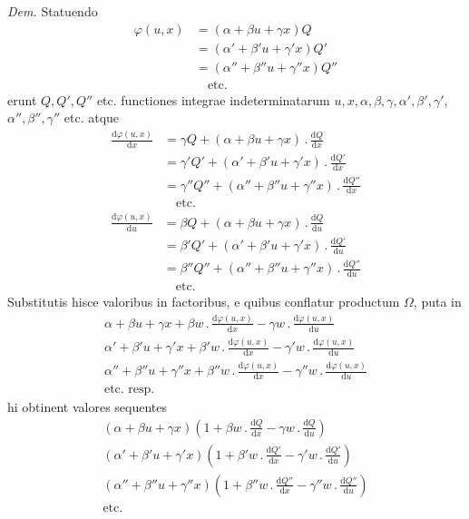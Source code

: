 \textit{Dem.} Statuendo
\[
\begin{aligned}
\varphi(u,x)&=(\alpha+\beta u+\gamma x)Q\\
&=(\alpha'+\beta'u+\gamma'x)Q'\\
&=(\alpha''+\beta''u+\gamma''x)Q''\\
&\quad\text{etc.}
\end{aligned}
\]
erunt $Q,Q',Q''$ etc. functiones integrae indeterminatarum $u,\allowbreak x,\allowbreak \alpha,\allowbreak \beta,\allowbreak \gamma,\allowbreak \alpha',\allowbreak \beta',\allowbreak \gamma'$,
$\alpha'',\beta'',\gamma''$ etc. atque
\[
\begin{aligned}
\frac{\mathrm d\varphi(u,x)}{\mathrm dx}&=\gamma Q+(\alpha+\beta u+\gamma x)\, .\,\frac{\mathrm dQ}{\mathrm dx}\\
&=\gamma'Q'+(\alpha'+\beta'u+\gamma'x)\, .\,\frac{\mathrm dQ'}{\mathrm dx}\\
&=\gamma''Q''+(\alpha''+\beta''u+\gamma''x)\, .\,\frac{\mathrm dQ''}{\mathrm dx}\\
&\quad\text{etc.}
\end{aligned}
\]
\[
\begin{aligned}
\frac{\mathrm d\varphi(u,x)}{\mathrm du}&=\beta Q+(\alpha+\beta u+\gamma x)\, .\,\frac{\mathrm dQ}{\mathrm du}\\
&=\beta'Q'+(\alpha'+\beta'u+\gamma'x)\, .\,\frac{\mathrm dQ'}{\mathrm du}\\
&=\beta''Q''+(\alpha''+\beta''u+\gamma''x)\, .\,\frac{\mathrm dQ''}{\mathrm du}\\
&\quad\text{etc.}
\end{aligned}
\]
Substitutis hisce valoribus in factoribus, e quibus conflatur productum $\Omega$,
puta in
\[
\begin{gathered}
\alpha+\beta u+\gamma x+\beta w\, .\,\frac{\mathrm d\varphi(u,x)}{\mathrm dx}-\gamma w\, .\,\frac{\mathrm d\varphi(u,x)}{\mathrm du}\\
\alpha'+\beta'u+\gamma'x+\beta'w\, .\,\frac{\mathrm d\varphi(u,x)}{\mathrm dx}-\gamma'w\, .\,\frac{\mathrm d\varphi(u,x)}{\mathrm du}\\
\alpha''+\beta''u+\gamma''x+\beta''w\, .\,\frac{\mathrm d\varphi(u,x)}{\mathrm dx}-\gamma''w\, .\,\frac{\mathrm d\varphi(u,x)}{\mathrm du}\\
\text{etc. resp.}
\end{gathered}
\]
hi obtinent valores sequentes
\[
\begin{gathered}
(\alpha+\beta u+\gamma x)(1+\beta w\, .\,\tfrac{\mathrm dQ}{\mathrm dx}-\gamma w\, .\,\tfrac{\mathrm dQ}{\mathrm du})\\
(\alpha'+\beta'u+\gamma'x)(1+\beta'w\, .\,\tfrac{\mathrm dQ'}{\mathrm dx}-\gamma'w\, .\,\tfrac{\mathrm dQ'}{\mathrm du})\\
(\alpha''+\beta''u+\gamma''x)(1+\beta''w\, .\,\tfrac{\mathrm dQ''}{\mathrm dx}-\gamma''w\, .\,\tfrac{\mathrm dQ''}{\mathrm du})\\
\text{etc.}
\end{gathered}
\]
